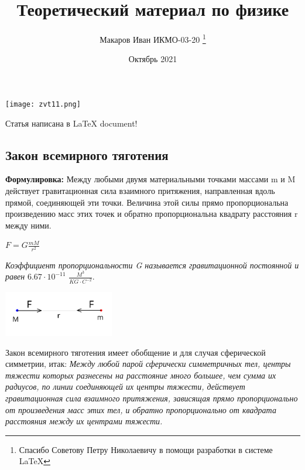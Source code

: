 \documentclass[12pt, letterpaper, twoside]{article}
\title{Теоретический материал по физике}
\author{Макаров Иван ИКМО-03-20 \thanks{Спасибо Советову Петру Николаевичу в помощи разработки в  системе LaTeX}}
\date{Октябрь 2021}
\begin{document}
\maketitle

\begin{center}    \qquad \texttt{[image: zvt11.png]}
\end{center}

\begin{center} Статья написана в \LaTeX{} document!
\end{center}

\newpage
\begin{center}
\section{Закон всемирного тяготения}

\end{center}

\textbf{Формулировка:} Между любыми двумя материальными точками массами m и M действует гравитационная сила взаимного притяжения, направленная вдоль прямой, соединяющей эти точки. Величина этой силы прямо пропорциональна произведению масс этих точек и обратно пропорциональна квадрату расстояния r между ними.\\
\begin{center}
    $F=G\frac{mM}{r^2}$\\
\end{center}

\textit{Коэффициент пропорциональности G  называется гравитационной постоянной и равен} $6.67 \cdot 10^{-11}$ $\frac{M^3}{KG \cdot C^{-2}}$.\\

\begin{center}    \qquad \includegraphics{zvt1.png}
 
\end{center}

Закон всемирного тяготения имеет обобщение и для случая сферической симметрии, итак:
\textit{Между любой парой сферически симметричных тел, центры тяжести которых разнесены на расстояние много большее, чем сумма их радиусов, по линии соединяющей их центры тяжести, действует гравитационная сила взаимного притяжения, зависящая прямо пропорционально от произведения масс этих тел, и обратно пропорционально от квадрата расстояния между их центрами тяжести.\\}
\end{document}
